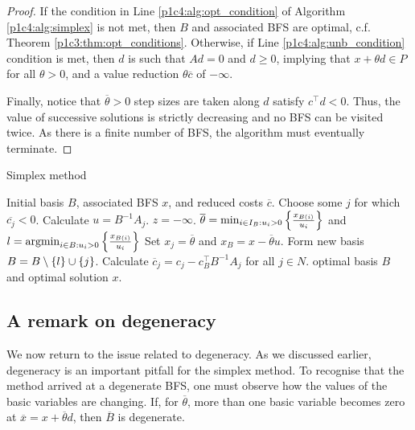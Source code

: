 \begin{proof}
	If the condition in Line \ref{p1c4:alg:opt_condition} of Algorithm \ref{p1c4:alg:simplex} is not met, then $B$ and associated BFS are optimal, c.f. Theorem \ref{p1c3:thm:opt_conditions}. Otherwise, if Line \ref{p1c4:alg:unb_condition} condition is met, then $d$ is such that $Ad = 0$ and $d \geq 0$, implying that $x + \theta d \in P$ for all $\theta > 0$, and a value reduction $\theta\overline{c}$ of $-\infty$.
	
	Finally, notice that $\overline{\theta}>0$ step sizes are taken along $d$ satisfy $c^\top d < 0$. Thus, the value of successive solutions is strictly decreasing and no BFS can be visited twice. As there is a finite number of BFS, the algorithm must eventually terminate.
\end{proof}

\begin{algorithm}[h]
	\caption{Simplex method} \label{p1c4:alg:simplex}
	\begin{algorithmic}[1] %
		 Initial basis $B$, associated BFS $x$, and reduced costs $\overline{c}$.
		 \label{p1c4:alg:opt_condition} 
		    \State Choose some $j$ for which $\overline{c_j} < 0$. Calculate $u = B^{-1}A_j$. 
		     \label{p1c4:alg:unb_condition}
				 $z = -\infty$.		
			\Else
				\State $\overline{\theta} = \min_{i \in I_B : u_i > 0} \left\{ \frac{x_{B(i)}}{u_i} \right \}$ and $l = \mathop{\rm argmin}_{i \in B : u_i > 0} \left\{ \frac{x_{B(i)}}{u_i} \right \}$ 
				\State Set $x_j = \overline{\theta}$ and $x_B = x - \overline{\theta}u$. Form new basis $B = B \setminus \left\{ l \right \} \cup \left\{ j \right \}$.  
				\State Calculate $\overline{c}_j = c_j - c_B^\top B^{-1}A_j$ for all $j \in N$.
			\EndIf
		\EndWhile
		 optimal basis $B$ and optimal solution $x$.
	\end{algorithmic}
\end{algorithm}


\subsection{A remark on degeneracy}

We now return to the issue related to degeneracy. As we discussed earlier, degeneracy is an important pitfall for the simplex method. To recognise that the method arrived at a degenerate BFS, one must observe how the values of the basic variables are changing. If, for $\overline{\theta}$, more than one basic variable becomes zero at $\overline{x} = x +\overline{\theta}d$, then $\overline{B}$ is degenerate.

